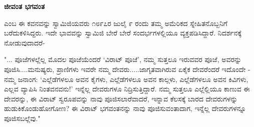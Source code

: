 \begin{myquote}
\end{myquote}

\begin{myquote}
\end{myquote}

\begin{myquote}
\end{myquote}

\begin{myquote}
\end{myquote}

\selectkan

\begin{center}
\textbf{ಜೀವಂತ ಭಗವಂತ}
\end{center}

 ಎಂಬ ಈ ಕವನವನ್ನು ಸ್ವಾಮಿಜಿಯವರು ೧೮೯೭ರ ಜುಲೈ ೯ ರಂದು ತಮ್ಮ ಅಮೆರಿಕದ ಸ್ನೇಹಿತನೊಬ್ಬನಿಗೆ ಬರೆದುಕಳಿಸಿದ್ದರು. ಇದೇ ಭಾವವನ್ನು ಸ್ವಾಮಿಜಿ ಬೇರೆ ಬೇರೆ ಸಂದರ್ಭಗಳಲ್ಲಿಯೂ ವ್ಯಕ್ತಪಡಿಸಿದ್ದಾರೆ. ನಿದರ್ಶನಕ್ಕೆ ನೋಡುವುದಾದರೆ-

"... ಪೂಜೆಗಳಲ್ಲೆಲ್ಲ ಮೊದಲ ಪೂಜೆಯೆಂದರೆ ‘ವಿರಾಟ್ ಪೂಜೆ’, ನಮ್ಮ ಸುತ್ತಲೂ ಇರುವವರ ಪೂಜೆ, ಅವರನ್ನು ಪೂಜಿಸಿ....ಮನುಷ್ಯರು, ಪ್ರಾಣಿಗಳು ಇವರೇ ನಮ್ಮ ದೇವರು.....ಜಾಗೃತವಾಗಿರುವ ಏಕೈಕ ದೇವರೆಂದರೆ ಇದೊಂದೇ - ನಮ್ಮ ಜನಾಂಗ: ‘ಎಲ್ಲೆಡೆಗಳಲೂ ಅವನ ಕೈಗಳು, ಎಲ್ಲೆಡೆಗಳಲೂ ಅವನ ಕಾಲ್ಗಳು, ಎಲ್ಲೆಡೆಗಳಲೂ ಅವನ ಕಿವಿಗಳು, ಎಲ್ಲವ ವ್ಯಾಪಿಸಿ ನಿಂತವನವನು!’ ಇನ್ನೆಲ್ಲ ದೇವರುಗಳೂ ನಿದ್ರಿಸುತ್ತಿದ್ದಾರೆ. ನಮ್ಮ ಸುತ್ತಲೂ ಎಲ್ಲೆಲ್ಲಿಯೂ ಕಾಣುವ ಈ ದೇವರನ್ನು, ಈ ವಿರಾಟ್ ಸ್ವರೂಪವನ್ನು ನಾವು ಪೂಜಿಸಲಾರೆವಾದರೆ, ಇನ್ನಾವ ಕೆಲಸಕ್ಕೆ ಬಾರದ ದೇವರುಗಳನ್ನು ಹುಡುಕಿಕೊಂಡುಹೋಗೋಣ? ಈ ವಿರಾಟ್ ಭಗವಂತನನ್ನು ನಾವು ಪೂಜಿಸುವಂತಾದಾಗ, ಇನ್ನೆಲ್ಲ ದೇವರುಗಳನ್ನೂ ಪೂಜಿಸಬಲ್ಲೆವು."

